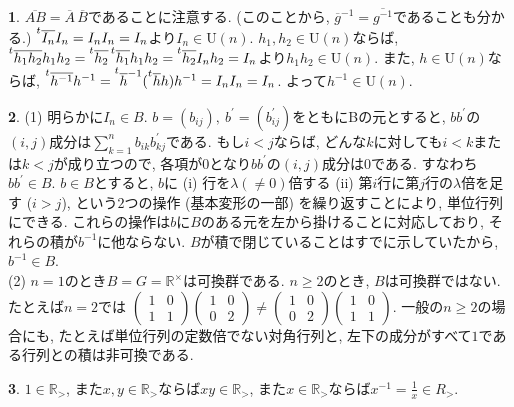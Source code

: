 \documentclass{article}
\theoremstyle{definition}
\newtheorem{ans}{}
\numberwithin{ans}{subsection}
\newcommand{\transpose}[1]{{\prescript{t}{}{#1}}}
\newcommand{\U}[1]{\mathrm{U}(#1)}
\begin{document}
\begin{ans}
  $\overline{AB} = \overline{A}\,\overline{B}$であることに注意する.
  (このことから, $\overline{g}^{-1} = \overline{g^{-1}}$であることも分かる.)
  $\transpose{\overline{I_n}I_n} = I_nI_n = I_n$より$I_n \in \U{n}$.
  $h_1, h_2 \in \U{n}$ならば,
  $\transpose{\overline{h_1h_2}}h_1h_2
  = \transpose{\overline{h_2}}\,\transpose{\overline{h_1}}h_1h_2
  = \transpose{\overline{h_2}}I_nh_2 = I_n$より$h_1h_2 \in \U{n}$.
  また, $h \in \U{n}$ならば,
  $\transpose{\overline{h^{-1}}}h^{-1}
  = \transpose{\overline{h}^{-1}}(\transpose{\overline{h}}h)h^{-1}
  = I_nI_n = I_n$.
  よって$h^{-1} \in \U{n}$.
\end{ans}

\begin{ans}
  (1) 明らかに$I_n \in B$.
  $b = (b_{ij}),\ b^\prime = (b^\prime_{ij})$をともにBの元とすると,
  $bb^\prime$の$(i, j)$成分は$\sum_{k = 1}^nb_{ik}b^\prime_{kj}$である.
  もし$i < j$ならば, どんな$k$に対しても$i < k$または$k < j$が成り立つので,
  各項が$0$となり$bb^\prime$の$(i, j)$成分は$0$である. すなわち$bb^\prime \in B$.
  $b \in B$とすると, $b$に
  (i) 行を$\lambda (\neq 0)$倍する
  (ii) 第$i$行に第$j$行の$\lambda$倍を足す ($i > j$),
  という$2$つの操作 (基本変形の一部) を繰り返すことにより, 単位行列にできる.
  これらの操作は$b$に$B$のある元を左から掛けることに対応しており, それらの積が$b^{-1}$に他ならない.
  $B$が積で閉じていることはすでに示していたから, $b^{-1} \in B$.\\
  (2) $n = 1$のとき$B = G = \mathbb{R}^\times$は可換群である.
  $n \ge 2$のとき, $B$は可換群ではない. たとえば$n = 2$では
  $\begin{pmatrix}
    1 & 0 \\
    1 & 1
  \end{pmatrix}\begin{pmatrix}
    1 & 0 \\
    0 & 2
  \end{pmatrix} \neq \begin{pmatrix}
    1 & 0 \\
    0 & 2
  \end{pmatrix}\begin{pmatrix}
    1 & 0 \\
    1 & 1
  \end{pmatrix}$.
  一般の$n \ge 2$の場合にも, たとえば単位行列の定数倍でない対角行列と,
  左下の成分がすべて$1$である行列との積は非可換である.
\end{ans}

\begin{ans}
  $1 \in \mathbb{R}_>$,
  また$x, y \in \mathbb{R}_>$ならば$xy \in \mathbb{R}_>$,
  また$x \in \mathbb{R}_>$ならば$x^{-1} = \frac{1}{x} \in {R}_>$.
\end{ans}
\end{document}
